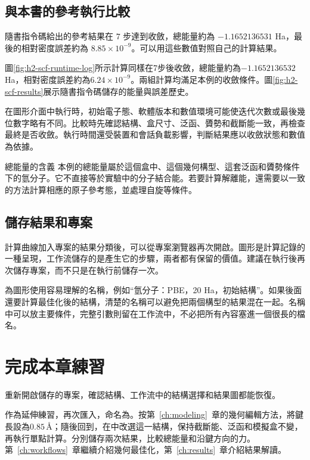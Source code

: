 \subsection{與本書的參考執行比較}

隨書指令碼給出的參考結果在 $7$ 步達到收斂，總能量約為 $-1.1652136531$ Ha，最後的相對密度誤差約為 $8.85\times10^{-9}$。可以用這些數值對照自己的計算結果。

圖\ref{fig:h2-scf-runtime-log}所示計算同樣在7步後收斂，總能量約為$-1.1652136532$ Ha，相對密度誤差約為$6.24\times10^{-9}$。兩組計算均滿足本例的收斂條件。圖\ref{fig:h2-scf-results}展示隨書指令碼儲存的能量與誤差歷史。

在圖形介面中執行時，初始電子態、軟體版本和數值環境可能使迭代次數或最後幾位數字略有不同。比較時先確認結構、盒尺寸、泛函、贗勢和截斷能一致，再檢查最終是否收斂。執行時間還受裝置和會話負載影響，判斷結果應以收斂狀態和數值為依據。

\begin{notebox}{總能量的含義}
本例的總能量屬於這個盒中、這個幾何構型、這套泛函和贗勢條件下的氫分子。它不直接等於實驗中的分子結合能。若要計算解離能，還需要以一致的方法計算相應的原子參考態，並處理自旋等條件。
\end{notebox}

\subsection{儲存結果和專案}

計算曲線加入專案的結果分類後，可以從專案瀏覽器再次開啟。圖形是計算記錄的一種呈現，工作流儲存的是產生它的步驟，兩者都有保留的價值。建議在執行後再次儲存專案，而不只是在執行前儲存一次。

為圖形使用容易理解的名稱，例如“氫分子：PBE，20 Ha，初始結構”。如果後面還要計算最佳化後的結構，清楚的名稱可以避免把兩個構型的結果混在一起。名稱中可以放主要條件，完整引數則留在工作流中，不必把所有內容塞進一個很長的檔名。

\section{完成本章練習}

重新開啟儲存的專案，確認結構、工作流中的結構選擇和結果圖都能恢復。

作為延伸練習，再次匯入，命名為。按第~\ref{ch:modeling}~章的幾何編輯方法，將鍵長設為$0.85\,\text{\AA}$；隨後回到，在中改選這一結構，保持截斷能、泛函和模擬盒不變，再執行單點計算。分別儲存兩次結果，比較總能量和沿鍵方向的力。第~\ref{ch:workflows}~章繼續介紹幾何最佳化，第~\ref{ch:results}~章介紹結果解讀。

